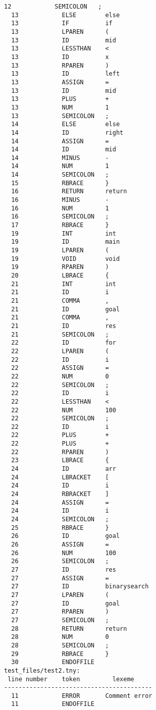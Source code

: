 \documentclass[a4paper, 10pt]{oblivoir}
\begin{document}
\begin{lstlisting}[caption=Output, frame=single]
  12            SEMICOLON   ;
  13            ELSE        else
  13            IF          if
  13            LPAREN      (
  13            ID          mid
  13            LESSTHAN    <
  13            ID          x
  13            RPAREN      )
  13            ID          left
  13            ASSIGN      =
  13            ID          mid
  13            PLUS        +
  13            NUM         1
  13            SEMICOLON   ;
  14            ELSE        else
  14            ID          right
  14            ASSIGN      =
  14            ID          mid
  14            MINUS       -
  14            NUM         1
  14            SEMICOLON   ;
  15            RBRACE      }
  16            RETURN      return
  16            MINUS       -
  16            NUM         1
  16            SEMICOLON   ;
  17            RBRACE      }
  19            INT         int
  19            ID          main
  19            LPAREN      (
  19            VOID        void
  19            RPAREN      )
  20            LBRACE      {
  21            INT         int
  21            ID          i
  21            COMMA       ,
  21            ID          goal
  21            COMMA       ,
  21            ID          res
  21            SEMICOLON   ;
  22            ID          for
  22            LPAREN      (
  22            ID          i
  22            ASSIGN      =
  22            NUM         0
  22            SEMICOLON   ;
  22            ID          i
  22            LESSTHAN    <
  22            NUM         100
  22            SEMICOLON   ;
  22            ID          i
  22            PLUS        +
  22            PLUS        +
  22            RPAREN      )
  23            LBRACE      {
  24            ID          arr
  24            LBRACKET    [
  24            ID          i
  24            RBRACKET    ]
  24            ASSIGN      =
  24            ID          i
  24            SEMICOLON   ;
  25            RBRACE      }
  26            ID          goal
  26            ASSIGN      =
  26            NUM         100
  26            SEMICOLON   ;
  27            ID          res
  27            ASSIGN      =
  27            ID          binarysearch
  27            LPAREN      (
  27            ID          goal
  27            RPAREN      )
  27            SEMICOLON   ;
  28            RETURN      return
  28            NUM         0
  28            SEMICOLON   ;
  29            RBRACE      }
  30            ENDOFFILE   
test_files/test2.tny:
 line number    token         lexeme    
-----------------------------------------
  11            ERROR       Comment error
  11            ENDOFFILE
\end{lstlisting}
\end{document}
